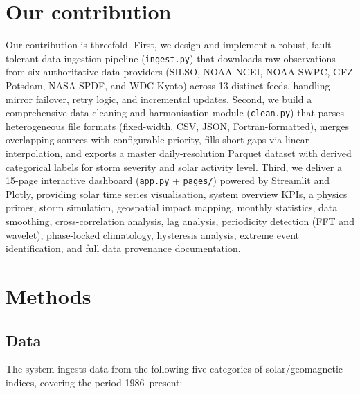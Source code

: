 \section{Our contribution}

Our contribution is threefold. First, we design and implement a robust, fault-tolerant data ingestion pipeline (\texttt{ingest.py}) that downloads raw observations from six authoritative data providers (SILSO, NOAA NCEI, NOAA SWPC, GFZ Potsdam, NASA SPDF, and WDC Kyoto) across 13 distinct feeds, handling mirror failover, retry logic, and incremental updates. Second, we build a comprehensive data cleaning and harmonisation module (\texttt{clean.py}) that parses heterogeneous file formats (fixed-width, CSV, JSON, Fortran-formatted), merges overlapping sources with configurable priority, fills short gaps via linear interpolation, and exports a master daily-resolution Parquet dataset with derived categorical labels for storm severity and solar activity level. Third, we deliver a 15-page interactive dashboard (\texttt{app.py} + \texttt{pages/}) powered by Streamlit and Plotly, providing solar time series visualisation, system overview KPIs, a physics primer, storm simulation, geospatial impact mapping, monthly statistics, data smoothing, cross-correlation analysis, lag analysis, periodicity detection (FFT and wavelet), phase-locked climatology, hysteresis analysis, extreme event identification, and full data provenance documentation.


\section{Methods}
\subsection{Data}

The system ingests data from the following five categories of solar/geomagnetic indices, covering the period 1986--present:

